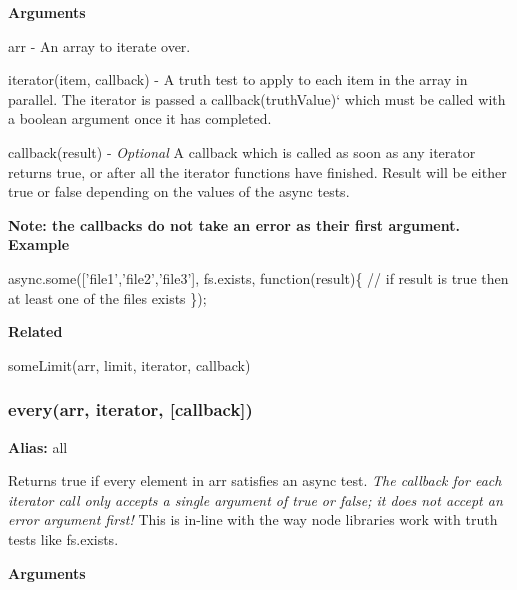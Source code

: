 {\bfseries Arguments}


\begin{DoxyItemize}
\item {\ttfamily arr} -\/ An array to iterate over.
\item {\ttfamily iterator(item, callback)} -\/ A truth test to apply to each item in the array in parallel. The iterator is passed a {\ttfamily callback(truth\+Value)}` which must be called with a boolean argument once it has completed.
\item {\ttfamily callback(result)} -\/ {\itshape Optional} A callback which is called as soon as any iterator returns {\ttfamily true}, or after all the iterator functions have finished. Result will be either {\ttfamily true} or {\ttfamily false} depending on the values of the async tests.

{\bfseries Note\+: the callbacks do not take an error as their first argument.} {\bfseries Example}
\end{DoxyItemize}


\begin{DoxyCode}
async.some(['file1','file2','file3'], fs.exists, function(result)\{
    // if result is true then at least one of the files exists
\});
\end{DoxyCode}


{\bfseries Related}


\begin{DoxyItemize}
\item some\+Limit(arr, limit, iterator, callback) 


\end{DoxyItemize}

\label{_every}%
 \subsubsection*{every(arr, iterator, \mbox{[}callback\mbox{]})}

{\bfseries Alias\+:} {\ttfamily all}

Returns {\ttfamily true} if every element in {\ttfamily arr} satisfies an async test. {\itshape The callback for each {\ttfamily iterator} call only accepts a single argument of {\ttfamily true} or {\ttfamily false}; it does not accept an error argument first!} This is in-\/line with the way node libraries work with truth tests like {\ttfamily fs.\+exists}.

{\bfseries Arguments}


